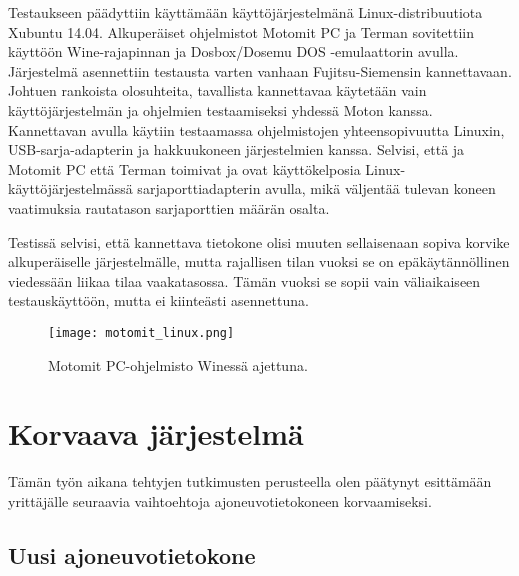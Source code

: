 Testaukseen päädyttiin käyttämään käyttöjärjestelmänä Linux-distribuutiota Xubuntu 14.04. Alkuperäiset ohjelmistot Motomit PC ja Terman sovitettiin käyttöön Wine-rajapinnan ja Dosbox/Dosemu DOS -emulaattorin avulla. Järjestelmä asennettiin testausta varten vanhaan Fujitsu-Siemensin kannettavaan. Johtuen rankoista olosuhteita, tavallista kannettavaa käytetään vain käyttöjärjestelmän ja ohjelmien testaamiseksi yhdessä Moton kanssa. Kannettavan avulla käytiin testaamassa ohjelmistojen yhteensopivuutta Linuxin, USB-sarja-adapterin ja hakkuukoneen järjestelmien kanssa. Selvisi, että ja Motomit PC että Terman toimivat ja ovat käyttökelposia Linux-käyttöjärjestelmässä sarjaporttiadapterin avulla, mikä väljentää tulevan koneen vaatimuksia rautatason sarjaporttien määrän osalta.

Testissä selvisi, että kannettava tietokone olisi muuten sellaisenaan sopiva korvike alkuperäiselle järjestelmälle, mutta rajallisen tilan vuoksi se on epäkäytännöllinen viedessään liikaa tilaa vaakatasossa. Tämän vuoksi se sopii vain väliaikaiseen testauskäyttöön, mutta ei kiinteästi asennettuna.


\begin{figure}[H]
\centering
\texttt{[image: motomit\_linux.png]}
\caption{Motomit PC-ohjelmisto Winessä ajettuna.}
\end{figure}


\newpage

\chapter{Korvaava järjestelmä}
\label{ch:korvaava_jarjestelma}

Tämän työn aikana tehtyjen tutkimusten perusteella olen päätynyt esittämään yrittäjälle seuraavia vaihtoehtoja ajoneuvotietokoneen korvaamiseksi.

\section{Uusi ajoneuvotietokone}

